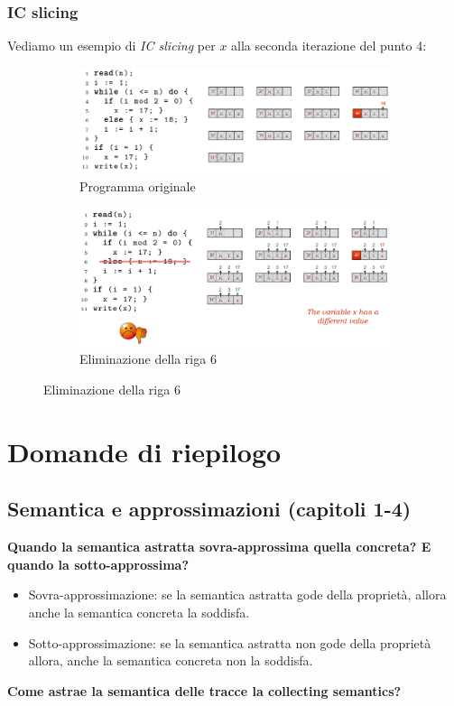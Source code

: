 \documentclass[a4paper,oneside,titlepage]{book}
\begin{document}
\subsection{IC slicing}
Vediamo un esempio di \textit{IC slicing} per $x$ alla seconda iterazione del punto 4:
\begin{figure}[htp]
	\begin{subfigure}{0.49\textwidth}
	    \centering
		\includegraphics[width=\textwidth, height=\textheight, keepaspectratio]{ic1.png}
		\caption{Programma originale}
	\end{subfigure}
	\hfill
	\begin{subfigure}{0.49\textwidth}
	    \centering
		\includegraphics[width=\textwidth, height=\textheight, keepaspectratio]{ic2.png}
		\caption{Eliminazione della riga 6}
	\end{subfigure}
\end{figure}


\appendix
\chapter{Domande di riepilogo}

\section{Semantica e approssimazioni (capitoli 1-4)}
\textbf{Quando la semantica astratta sovra-approssima quella concreta? E quando la sotto-approssima?}
\begin{itemize}
    \item Sovra-approssimazione: se la semantica astratta gode della proprietà, allora anche la semantica concreta la soddisfa.
    \item Sotto-approssimazione: se la semantica astratta non gode della proprietà allora, anche la semantica concreta non la soddisfa.
\end{itemize}
\noindent
\textbf{Come astrae la semantica delle tracce la collecting semantics?}
\end{document}
